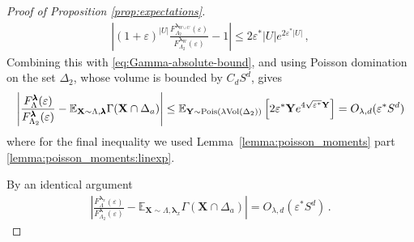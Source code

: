 \documentclass[10pt]{amsart}
\theoremstyle{definition}
\theoremstyle{remark}
\newcommand{\Pois}{\textup{Pois}}
\newcommand{\bX}{\mathbf{X}}
\newcommand{\bY}{\mathbf{Y}}
\newcommand{\E}{\mathbb{E}}
\newcommand{\region}{\Lambda}
\newcommand{\activity}{\lambda}
\newcommand{\activities}{\pmb{\lambda}}
\newcommand{\vol}{\mathrm{Vol}}
\newcommand{\absolute}[1]{\left\lvert#1\right\rvert}
\newcommand{\epsbound}{\varepsilon^{*}}
\begin{document}
\begin{proof}[Proof of Proposition \ref{prop:expectations}]
\begin{align*}
			\absolute{
				(1+\varepsilon)^{\absolute{U}}
				\frac{F_{\region_2}^{\activities_{W\cup U}}(\varepsilon)}
				{F_{\region_2}^{\activities_W}(\varepsilon)}
				-1
			}
			\le
			2\epsbound \absolute{U}
			e^{2\epsbound \absolute{U}}\, ,
		\end{align*}
		Combining this with \eqref{eq:Gamma-absolute-bound}, and using Poisson
		domination on the set \(\Delta_2\), whose volume is bounded by \(C_dS^d\), gives
		\begin{align}\label{eq:screen-approx-no-x}
			\absolute{
				\frac{F_{\region}^{\activities}(\varepsilon)}
				{F_{\region_2}^{\activities}(\varepsilon)}
				-
				\E_{\bX\sim\region,\activities}\Gamma(\bX\cap\Delta_a)
			}
			\le
			\E_{\bY \sim \Pois(\activity \vol(\Delta_2))}
			\left[
			2\epsbound \bY e^{4\sqrt{\epsbound}\bY}
			\right]=O_{\lambda,d}(\epsbound S^d)
		\end{align}
		where for the final inequality we used Lemma~\ref{lemma:poisson_moments} part \ref{lemma:poisson_moments:linexp}.
		
		By an identical argument
		\begin{align}\label{eq:screen-approx-with-x}
			\absolute{
				\frac{F_{\region}^{\activities_x}(\varepsilon)}
				{F_{\region_2}^{\activities}(\varepsilon)}
				-
				\E_{\bX\sim\region,\activities_x}\Gamma(\bX\cap\Delta_a)
			}
			=O_{\lambda,d}(\epsbound S^d)\, .
		\end{align}
		
		
		

\end{proof}
\end{document}
